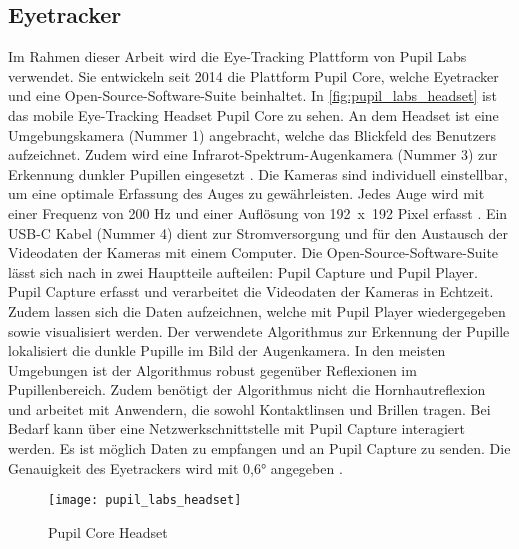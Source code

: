 \subsection{Eyetracker}
Im Rahmen dieser Arbeit wird die Eye-Tracking Plattform von Pupil Labs verwendet. Sie entwickeln seit 2014 die Plattform Pupil Core, welche Eyetracker und eine Open-Source-Software-Suite beinhaltet. In \autoref{fig:pupil_labs_headset} ist das mobile Eye-Tracking Headset Pupil Core zu sehen. An dem Headset ist eine Umgebungskamera (Nummer 1) angebracht, welche das Blickfeld des Benutzers aufzeichnet. Zudem wird eine Infrarot-Spektrum-Augenkamera (Nummer 3) zur Erkennung dunkler Pupillen eingesetzt \cite{Kassner_2014}. Die Kameras sind individuell einstellbar, um eine optimale Erfassung des Auges zu gewährleisten. Jedes Auge wird mit einer Frequenz von 200 Hz und einer Auflösung von \mbox{192 x 192} Pixel erfasst \cite{PupilLabsSpec}. Ein USB-C Kabel (Nummer 4) dient zur Stromversorgung und für den Austausch der Videodaten der Kameras mit einem Computer. Die Open-Source-Software-Suite lässt sich nach \citeauthor{Kassner_2014} in zwei Hauptteile aufteilen: Pupil Capture und Pupil Player. Pupil Capture erfasst und verarbeitet die Videodaten der Kameras in Echtzeit. Zudem lassen sich die Daten aufzeichnen, welche mit Pupil Player wiedergegeben sowie visualisiert werden. Der verwendete Algorithmus zur Erkennung der Pupille lokalisiert die dunkle Pupille im Bild der Augenkamera. In den meisten Umgebungen ist der Algorithmus robust gegenüber Reflexionen im Pupillenbereich. Zudem benötigt der Algorithmus nicht die Hornhautreflexion und arbeitet mit Anwendern, die sowohl Kontaktlinsen und Brillen tragen. \cite{Kassner_2014} Bei Bedarf kann über eine Netzwerkschnittstelle mit Pupil Capture interagiert werden. Es ist möglich Daten zu empfangen und an Pupil Capture zu senden. \cite{PupilLabsNet} Die Genauigkeit des Eyetrackers wird mit 0,6° angegeben \cite{PupilLabsSpec}.

\begin{figure}[!htbp]
	\centering
	\texttt{[image: pupil\_labs\_headset]}
	\caption[Pupil Core Headset]{Pupil Core Headset \cite{PupilLabsHW}}
	\label{fig:pupil_labs_headset}
\end{figure}

